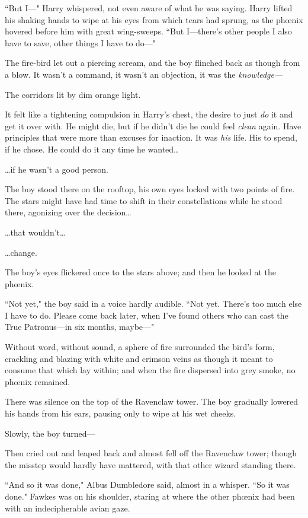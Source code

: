 ``But I---" Harry whispered, not even aware of what he was saying. Harry lifted his shaking hands to wipe at his eyes from which tears had sprung, as the phœnix hovered before him with great wing-sweeps. ``But I---there's other people I also have to save, other things I have to do---"

The fire-bird let out a piercing scream, and the boy flinched back as though from a blow. It wasn't a command, it wasn't an objection, it was the \emph{knowledge---}

The corridors lit by dim orange light.

It felt like a tightening compulsion in Harry's chest, the desire to just \emph{do} it and get it over with. He might die, but if he didn't die he could feel \emph{clean} again. Have principles that were more than excuses for inaction. It was \emph{his} life. His to spend, if he chose. He could do it any time he wanted{\ldots}

{\ldots}if he wasn't a good person.

\later

The boy stood there on the rooftop, his own eyes locked with two points of fire. The stars might have had time to shift in their constellations while he stood there, agonizing over the decision{\ldots}

{\ldots}that wouldn't{\ldots}

{\ldots}change.

The boy's eyes flickered once to the stars above; and then he looked at the phœnix.

``Not yet," the boy said in a voice hardly audible. ``Not yet. There's too much else I have to do. Please come back later, when I've found others who can cast the True Patronus---in six months, maybe---"

Without word, without sound, a sphere of fire surrounded the bird's form, crackling and blazing with white and crimson veins as though it meant to consume that which lay within; and when the fire dispersed into grey smoke, no phœnix remained.

There was silence on the top of the Ravenclaw tower. The boy gradually lowered his hands from his ears, pausing only to wipe at his wet cheeks.

Slowly, the boy turned---

Then cried out and leaped back and almost fell off the Ravenclaw tower; though the misstep would hardly have mattered, with that other wizard standing there.

``And so it was done," Albus Dumbledore said, almost in a whisper. ``So it was done." Fawkes was on his shoulder, staring at where the other phœnix had been with an indecipherable avian gaze.


